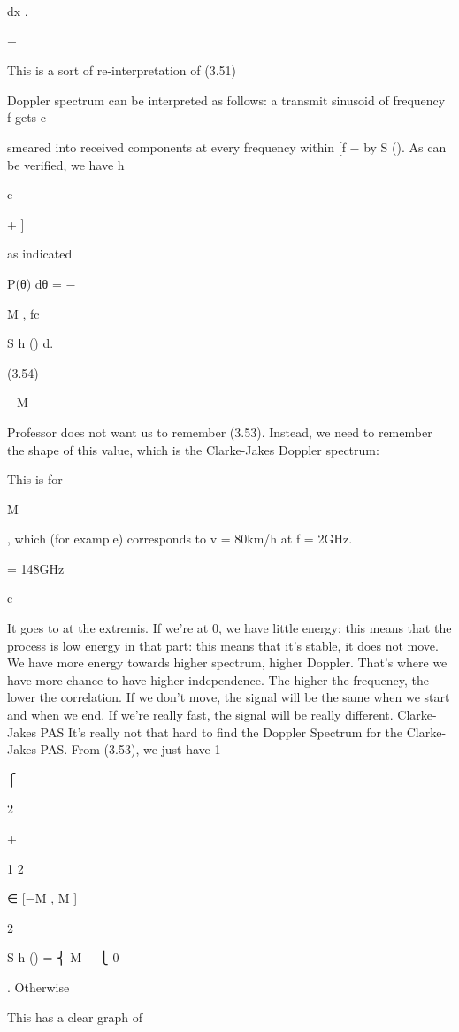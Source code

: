 {{{{dx .

−\infty

This is a sort of re-interpretation of (3.51)

Doppler spectrum can be interpreted as follows: a transmit sinusoid of frequency f gets c

smeared into received components at every frequency within [f − \nu by S (\nu). As can be verified, we have h

c

\pi

\int

+ \nuM ]

as indicated

\nuM

P(θ) dθ = \int
−\pi

M , fc

S h (\nu) d\nu .

(3.54)

−\nu M

Professor does not want us to remember (3.53). Instead, we need to remember the shape of this value, which is the Clarke-Jakes Doppler spectrum:

This is for \nu

M

, which (for example) corresponds to v = 80km/h at f = 2GHz.

= 148GHz

c

It goes to \infty at the extremis.
If we're at 0, we have little energy; this means that the process is low energy in that part: this means that it's stable, it does not move. We have more energy towards higher spectrum, higher Doppler. That's where we have more chance to have higher independence.
The higher the frequency, the lower the correlation.
If we don't move, the signal will be the same when we start and when we end. If we're really fast, the signal will be really different.
​Clarke-Jakes PAS It's really not that hard to find the Doppler Spectrum for the Clarke-Jakes PAS.
From (3.53), we just have 1

⎧

2\pi

+

1 2\pi

\nu ∈ [−\nu M , \nu M ]

2

S h (\nu) = ⎨ \sqrt\nu M −
⎩
0

.
Otherwise

This has a clear graph of

}}}}
